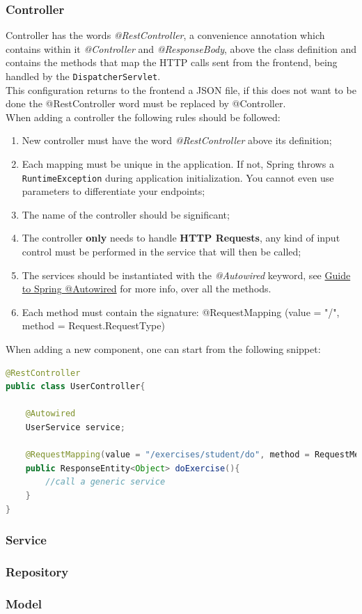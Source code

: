 \subsubsection{Controller}
Controller has the words \textit{@RestController}, a convenience annotation which contains within it \textit{@Controller} and \textit{@ResponseBody}, above the class definition and contains the methods that map the HTTP calls sent from the frontend, being handled by the \texttt{DispatcherServlet}.\\
This configuration returns to the frontend a JSON file, if this does not want to be done the @RestController word must be replaced by @Controller.\\
When adding a controller the following rules should be followed:
\begin{enumerate}
\item New controller must have the word \textit{@RestController} above its definition;
\item Each mapping must be unique in the application. If not, Spring throws a \texttt{RuntimeException} during application initialization. You cannot even use parameters to differentiate your endpoints;
\item The name of the controller should be significant;
\item The controller \textbf{only} needs to handle \textbf{HTTP Requests}, any kind of input control must be performed in the service that will then be called;
\item The services should be instantiated with the \textit{@Autowired} keyword, see \href{https://www.baeldung.com/spring-autowire}{Guide to Spring @Autowired} for more info, over all the methods.
\item Each method must contain the signature: @RequestMapping (value = "/", method = Request.RequestType)
\end{enumerate}
When adding a new component, one can start from the following snippet:
\begin{lstlisting}[language=Java]
@RestController
public class UserController{

	@Autowired
	UserService service; 
	
	@RequestMapping(value = "/exercises/student/do", method = RequestMethod.POST, produces = MediaType.APPLICATION_JSON_VALUE)
	public ResponseEntity<Object> doExercise(){
		//call a generic service
	}
}
\end{lstlisting}
\subsubsection{Service}
\subsubsection{Repository}
\subsubsection{Model}
